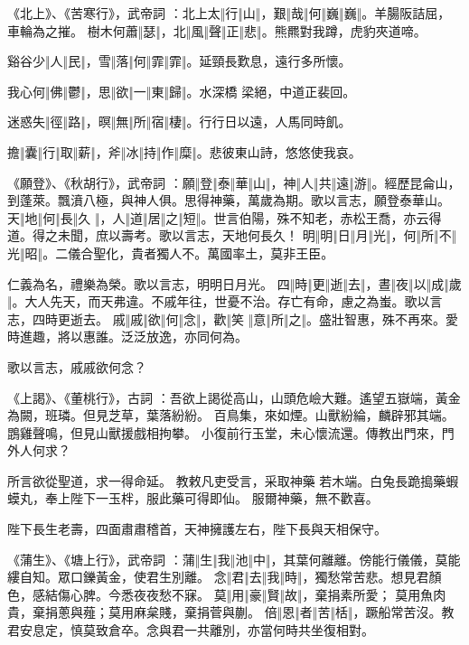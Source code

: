 \begin{pinyinscope}
《北上》、《苦寒行》，武帝詞
 ：北上太‖行‖山‖，艱‖哉‖何‖巍‖巍‖。羊腸阪詰屈，車輪為之摧。
 樹木何蕭‖瑟‖，北‖風‖聲‖正‖悲‖。熊羆對我蹲，虎豹夾道啼。


谿谷少‖人‖民‖，雪‖落‖何‖霏‖霏‖。延頸長歎息，遠行多所懷。


我心何‖佛‖鬱‖，思‖欲‖一‖東‖歸‖。水深橋
 梁絕，中道正裴回。


迷惑失‖徑‖路‖，暝‖無‖所‖宿‖棲‖。行行日以遠，人馬同時飢。


擔‖囊‖行‖取‖薪‖，斧‖冰‖持‖作‖糜‖。悲彼東山詩，悠悠使我哀。


《願登》、《秋胡行》，武帝詞
 ：願‖登‖泰‖華‖山‖，神‖人‖共‖遠‖游‖。經歷昆侖山，到蓬萊。飄濆八極，與神人俱。思得神藥，萬歲為期。歌以言志，願登泰華山。
 天‖地‖何‖長‖久
 ‖，人‖道‖居‖之‖短‖。世言伯陽，殊不知老，赤松王喬，亦云得道。得之未聞，庶以壽考。歌以言志，天地何長久！
 明‖明‖日‖月‖光‖，何‖所‖不‖光‖昭‖。二儀合聖化，貴者獨人不。萬國率土，莫非王臣。


仁義為名，禮樂為榮。歌以言志，明明日月光。
 四‖時‖更‖逝‖去‖，晝‖夜‖以‖成‖歲‖。大人先天，而天弗違。不戚年往，世憂不治。存亡有命，慮之為蚩。歌以言志，四時更逝去。
 戚‖戚‖欲‖何‖念‖，歡‖笑
 ‖意‖所‖之‖。盛壯智惠，殊不再來。愛時進趣，將以惠誰。泛泛放逸，亦同何為。


歌以言志，戚戚欲何念？


《上謁》、《董桃行》，古詞
 ：吾欲上謁從高山，山頭危嶮大難。遙望五嶽端，黃金為闕，班璘。但見芝草，葉落紛紛。
 百鳥集，來如煙。山獸紛綸，麟辟邪其端。鵾雞聲鳴，但見山獸援戲相拘攀。
 小復前行玉堂，未心懷流還。傳教出門來，門外人何求？


所言欲從聖道，求一得命延。
 教敕凡吏受言，采取神藥
 若木端。白兔長跪搗藥蝦蟆丸，奉上陛下一玉柈，服此藥可得即仙。
 服爾神藥，無不歡喜。


陛下長生老壽，四面肅肅稽首，天神擁護左右，陛下長與天相保守。


《蒲生》、《塘上行》，武帝詞
 ：蒲‖生‖我‖池‖中‖，其葉何離離。傍能行儀儀，莫能縷自知。眾口鑠黃金，使君生別離。
 念‖君‖去‖我‖時‖，獨愁常苦悲。想見君顏色，感結傷心脾。今悉夜夜愁不寐。
 莫‖用‖豪‖賢‖故‖，棄捐素所愛；
 莫用魚肉貴，棄捐蔥與薤；莫用麻枲賤，棄捐菅與蒯。
 倍‖恩‖者‖苦‖栝‖，蹶船常苦沒。教君安息定，慎莫致倉卒。念與君一共離別，亦當何時共坐復相對。



\end{pinyinscope}
